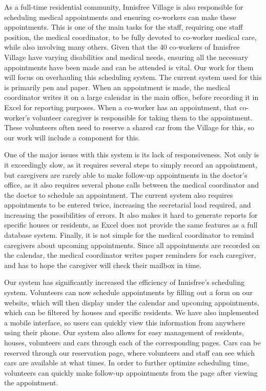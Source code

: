 \documentclass{sig-alternate}
\begin{document}
As a full-time residential community, Innisfree Village is also responsible for scheduling medical appointments and ensuring co-workers can make these appointments. This is one of the main tasks for the staff, requiring one staff position, the medical coordinator, to be fully devoted to co-worker medical care, while also involving many others. Given that the 40 co-workers of Innisfree Village have varying disabilities and medical needs, ensuring all the necessary appointments have been made and can be attended is vital. Our work for them will focus on overhauling this scheduling system. The current system used for this is primarily pen and paper. When an appointment is made, the medical coordinator writes it on a large calendar in the main office, before recording it in Excel for reporting purposes. When a co-worker has an appointment, that co-worker’s volunteer caregiver is responsible for taking them to the appointment. These volunteers often need to reserve a shared car from the Village for this, so our work will include a component for this.

One of the major issues with this system is its lack of responsiveness. Not only is it exceedingly slow, as it requires several steps to simply record an appointment, but caregivers are rarely able to make follow-up appointments in the doctor’s office, as it also requires several phone calls between the medical coordinator and the doctor to schedule an appointment. The current system also requires appointments to be entered twice, increasing the secretarial load required, and increasing the possibilities of errors. It also makes it hard to generate reports for specific houses or residents, as Excel does not provide the same features as a full database system. Finally, it is not simple for the medical coordinator to remind caregivers about upcoming appointments. Since all appointments are recorded on the calendar, the medical coordinator writes paper reminders for each caregiver, and has to hope the caregiver will check their mailbox in time.

Our system has significantly increased the efficiency of Innisfree's scheduling system. Volunteers can now schedule appointments by filling out a form on our website, which will then display under the calendar and upcoming appointments, which can be filtered by houses and specific residents. We have also implemented a mobile interface, so users can quickly view this information from anywhere using their phone. Our system also allows for easy management of residents, houses, volunteers and cars through each of the corresponding pages. Cars can be reserved through our reservation page, where volunteers and staff can see which cars are available at what times. In order to further optimize scheduling time, volunteers can quickly make follow-up appointments from the page after viewing the appointment. 
\end{document}
